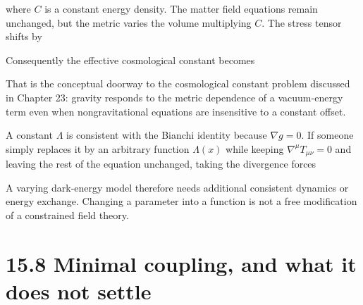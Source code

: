 \documentclass[
  11pt,
  letterpaper,
  oneside,
  openany]{scrbook}
\begin{document}
where \(C\) is a constant energy density. The matter field equations
remain unchanged, but the metric varies the volume multiplying \(C\).
The stress tensor shifts by

\begin{center}
\begingroup
{}
\ifdim\wd\grmathbox>\linewidth
\resizebox{\linewidth}{!}{\usebox{\grmathbox}}
\else\usebox{\grmathbox}\fi
\endgroup
\end{center}

Consequently the effective cosmological constant becomes

\begin{center}
\begingroup
{}
\ifdim\wd\grmathbox>\linewidth
\resizebox{\linewidth}{!}{\usebox{\grmathbox}}
\else\usebox{\grmathbox}\fi
\endgroup
\end{center}

That is the conceptual doorway to the cosmological constant problem
discussed in Chapter 23: gravity responds to the metric dependence of a
vacuum-energy term even when nongravitational equations are insensitive
to a constant offset.

A constant \(\Lambda\) is consistent with the Bianchi identity because
\(\nabla g=0\). If someone simply replaces it by an arbitrary function
\(\Lambda(x)\) while keeping \(\nabla^\mu T_{\mu\nu}=0\) and leaving the
rest of the equation unchanged, taking the divergence forces

\begin{center}
\begingroup
{}
\ifdim\wd\grmathbox>\linewidth
\resizebox{\linewidth}{!}{\usebox{\grmathbox}}
\else\usebox{\grmathbox}\fi
\endgroup
\end{center}

A varying dark-energy model therefore needs additional consistent
dynamics or energy exchange. Changing a parameter into a function is not
a free modification of a constrained field theory.

\hypertarget{minimal-coupling-and-what-it-does-not-settle}{%
\section{15.8 Minimal coupling, and what it does not
settle}\label{minimal-coupling-and-what-it-does-not-settle}}
\end{document}
